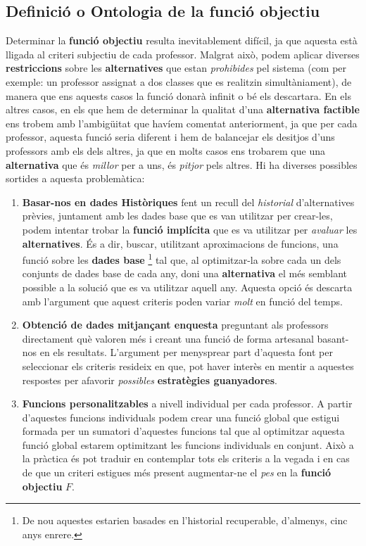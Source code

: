 \documentclass[10pt,twocolumn]{article}
\begin{document}
\subsection{Definició o Ontologia de la funció objectiu}
Determinar la \textbf{funció objectiu} resulta inevitablement difícil, ja que aquesta està lligada al criteri subjectiu de cada professor. Malgrat això, podem aplicar diverses \textbf{restriccions} sobre les  \textbf{alternatives} que estan \textit{prohibides} pel sistema (com per exemple: un professor assignat a dos classes que es realitzin simultàniament), de manera que ens aquests casos la funció donarà infinit o bé els descartara. En els altres casos, en els que hem de determinar la qualitat d'una \textbf{alternativa factible} ens trobem amb l'ambigüitat que havíem comentat anteriorment, ja que per cada professor, aquesta funció seria diferent i hem de balancejar els desitjos d'uns professors amb els dels altres, ja que en molts casos ens trobarem que una \textbf{alternativa} que és \textit{millor} per a uns, és \textit{pitjor} pels altres. Hi ha diverses possibles sortides a aquesta problemàtica:
\begin{enumerate}
	\item \textbf{Basar-nos en dades Històriques} fent un recull del \textit{historial}  d'alternatives prèvies, juntament amb les dades base que es van utilitzar per crear-les, podem intentar trobar la \textbf{funció implícita} que es va utilitzar per \textit{avaluar} les \textbf{alternatives}. És a dir, buscar, utilitzant aproximacions de funcions, una funció sobre les \textbf{dades base} \footnote{De nou aquestes estarien basades en l'historial recuperable, d'almenys, cinc anys enrere.} tal que, al optimitzar-la sobre cada un dels conjunts de dades base de cada any, doni una \textbf{alternativa} el més semblant possible a la solució que es va utilitzar aquell any. Aquesta opció és descarta amb l'argument que aquest criteris poden variar \textit{molt} en funció del temps.
	\item \textbf{Obtenció de dades mitjançant enquesta} preguntant als professors directament què valoren més i creant una funció de forma artesanal basant-nos en els resultats. L'argument per menysprear part d'aquesta font  per seleccionar els criteris resideix en que, pot haver interès en mentir a aquestes respostes per afavorir \textit{possibles} \textbf{estratègies guanyadores}.
	\item \textbf{Funcions personalitzables} a nivell individual per cada professor. A partir d'aquestes funcions individuals podem crear una funció global que estigui formada per un sumatori d'aquestes funcions tal que al optimitzar aquesta funció global estarem optimitzant les funcions individuals en conjunt. Això a la pràctica és pot traduir en contemplar tots els criteris a la vegada i en cas de que un criteri estigues més present augmentar-ne el \textit{pes} en la \textbf{funció objectiu} $F$.
\end{enumerate} 
\end{document}
